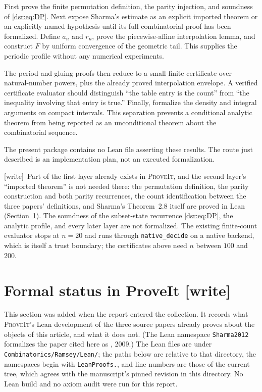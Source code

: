 \documentclass[11pt,a4paper]{article}
\numberwithin{equation}{section}
\theoremstyle{definition}
\theoremstyle{remark}
\newcommand{\repo}{\textsc{ProveIt}}
\newcommand{\wtag}{\textup{[write]}}
\newcommand{\lean}[1]{\nolinkurl{#1}}
\theoremstyle{definition}
\theoremstyle{plain}
\begin{document}
First prove the finite permutation definition, the parity injection, and
soundness of \eqref{dsr:eq:DP}. Next expose Sharma's estimate as an explicit
imported theorem or an explicitly named hypothesis until its full
combinatorial proof has been formalized. Define $a_n$ and $r_n$, prove the
piecewise-affine interpolation lemma, and construct $F$ by uniform convergence
of the geometric tail. This supplies the periodic profile without any
numerical experiments.

The period and gluing proofs then reduce to a small finite certificate over
natural-number powers, plus the already proved interpolation envelope.
A verified certificate evaluator should distinguish ``the table entry is the
count'' from ``the inequality involving that entry is true.'' Finally,
formalize the density and integral arguments on compact intervals. This
separation prevents a conditional analytic theorem from being reported as an
unconditional theorem about the combinatorial sequence.

The present package contains no Lean file asserting these results. The route
just described is an implementation plan, not an executed formalization.

\wtag\ Part of the first layer already exists in \repo, and the second
layer's ``imported theorem'' is not needed there: the permutation
definition, the parity construction and both parity recurrences, the count
identification between the three papers' definitions, and Sharma's
Theorem~2.8 itself are proved in Lean (Section~\ref{dsr:sec:formal}). The
soundness of the subset-state recurrence \eqref{dsr:eq:DP}, the analytic
profile, and every later layer are not formalized. The existing finite-count
evaluator stops at $n=20$ and runs through \lean{native_decide} on a native
backend, which is itself a trust boundary; the certificates above need
$n$ between $100$ and $200$.

\section{Formal status in ProveIt \wtag}
\label{dsr:sec:formal}
This section was added when the report entered the collection. It records
what \repo's Lean development of the three source papers
\cite{DEGS,Sharma,LV} already proves about the objects of this article, and
what it does not. (The Lean namespace \lean{Sharma2012} formalizes the
paper cited here as \cite{Sharma}, 2009.) The Lean files are under
\lean{Combinatorics/Ramsey/Lean/}; the paths below are relative to that
directory, the namespaces begin with \lean{LeanProofs.}, and line numbers
are those of the current tree, which agrees with the manuscript's pinned
revision in this directory. No Lean build and no axiom audit were run for
this report.
\end{document}
